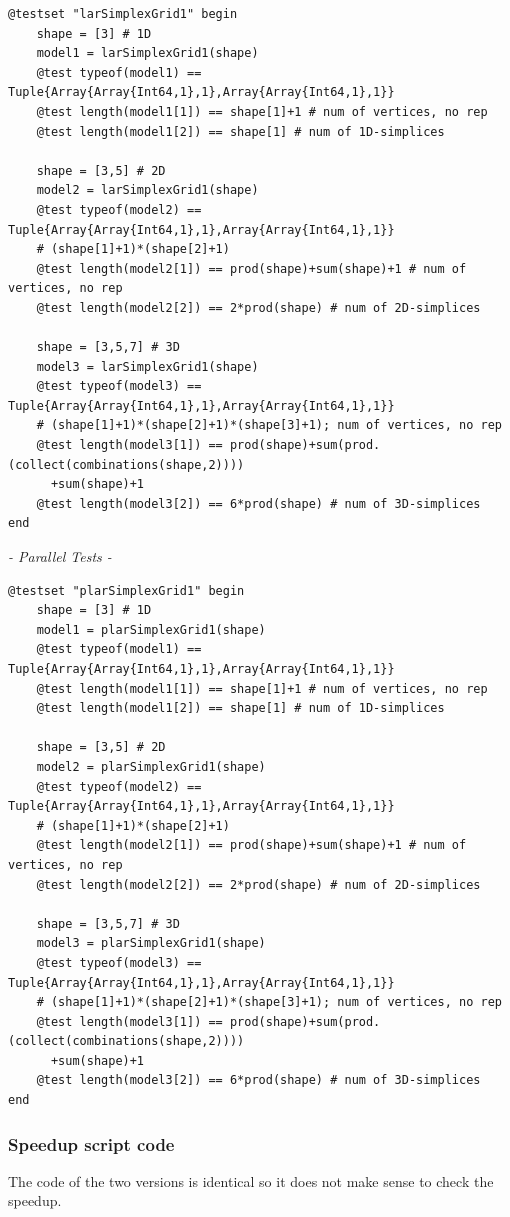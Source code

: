 \documentclass[a4paper,12pt,titlepage]{article}					%
\begin{document}
\begin{Verbatim}
@testset "larSimplexGrid1" begin
	shape = [3] # 1D
	model1 = larSimplexGrid1(shape)
	@test typeof(model1) == Tuple{Array{Array{Int64,1},1},Array{Array{Int64,1},1}}
	@test length(model1[1]) == shape[1]+1 # num of vertices, no rep
	@test length(model1[2]) == shape[1] # num of 1D-simplices
	
	shape = [3,5] # 2D
	model2 = larSimplexGrid1(shape)
	@test typeof(model2) == Tuple{Array{Array{Int64,1},1},Array{Array{Int64,1},1}}
	# (shape[1]+1)*(shape[2]+1)
	@test length(model2[1]) == prod(shape)+sum(shape)+1 # num of vertices, no rep
	@test length(model2[2]) == 2*prod(shape) # num of 2D-simplices
	
	shape = [3,5,7] # 3D
	model3 = larSimplexGrid1(shape)
	@test typeof(model3) == Tuple{Array{Array{Int64,1},1},Array{Array{Int64,1},1}}
	# (shape[1]+1)*(shape[2]+1)*(shape[3]+1); num of vertices, no rep
	@test length(model3[1]) == prod(shape)+sum(prod.(collect(combinations(shape,2))))
	  +sum(shape)+1
	@test length(model3[2]) == 6*prod(shape) # num of 3D-simplices
end
\end{Verbatim}

\emph{- Parallel Tests -}

\begin{Verbatim}
@testset "plarSimplexGrid1" begin
	shape = [3] # 1D
	model1 = plarSimplexGrid1(shape)
	@test typeof(model1) == Tuple{Array{Array{Int64,1},1},Array{Array{Int64,1},1}}
	@test length(model1[1]) == shape[1]+1 # num of vertices, no rep
	@test length(model1[2]) == shape[1] # num of 1D-simplices
	
	shape = [3,5] # 2D
	model2 = plarSimplexGrid1(shape)
	@test typeof(model2) == Tuple{Array{Array{Int64,1},1},Array{Array{Int64,1},1}}
	# (shape[1]+1)*(shape[2]+1)
	@test length(model2[1]) == prod(shape)+sum(shape)+1 # num of vertices, no rep
	@test length(model2[2]) == 2*prod(shape) # num of 2D-simplices
	
	shape = [3,5,7] # 3D
	model3 = plarSimplexGrid1(shape)
	@test typeof(model3) == Tuple{Array{Array{Int64,1},1},Array{Array{Int64,1},1}}
	# (shape[1]+1)*(shape[2]+1)*(shape[3]+1); num of vertices, no rep
	@test length(model3[1]) == prod(shape)+sum(prod.(collect(combinations(shape,2))))
	  +sum(shape)+1
	@test length(model3[2]) == 6*prod(shape) # num of 3D-simplices
end
\end{Verbatim}

\subsubsection{Speedup script code}
The code of the two versions is identical so it does not make sense to check the speedup.
\end{document}
